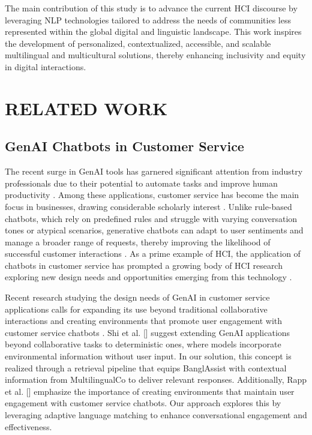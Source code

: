 \documentclass[sigconf]{acmart}
\begin{document}
The main contribution of this study is to advance the current HCI discourse by leveraging NLP technologies tailored to address the needs of communities less represented within the global digital and linguistic landscape. This work inspires the development of personalized, contextualized, accessible, and scalable multilingual and multicultural solutions, thereby enhancing inclusivity and equity in digital interactions.


\section{RELATED WORK}

\subsection{GenAI Chatbots in Customer Service}

The recent surge in GenAI tools has garnered significant attention from industry professionals due to their potential to automate tasks and improve human productivity \cite{brynjolfsson2023generative}. Among these applications, customer service has become the main focus in businesses, drawing considerable scholarly interest \cite{brynjolfsson2023generative, singla2024}. Unlike rule-based chatbots, which rely on predefined rules and struggle with varying conversation tones or atypical scenarios, generative chatbots can adapt to user sentiments and manage a broader range of requests, thereby improving the likelihood of successful customer interactions \cite{brynjolfsson2023generative}. As a prime example of HCI, the application of chatbots in customer service has prompted a growing body of HCI research exploring new design needs and opportunities emerging from this technology \cite{nicolescu2022human}.

Recent research studying the design needs of GenAI in customer service applications calls for expanding its use beyond traditional collaborative interactions \cite{shi2023hci} and creating environments that promote user engagement with customer service chatbots \cite{rapp2023collaborating}. Shi et al. [\citeyear{shi2023hci}] suggest extending GenAI applications beyond collaborative tasks to deterministic ones, where models incorporate environmental information without user input. In our solution, this concept is realized through a retrieval pipeline that equips BanglAssist with contextual information from MultilingualCo to deliver relevant responses. Additionally, Rapp et al. [\citeyear{rapp2023collaborating}] emphasize the importance of creating environments that maintain user engagement with customer service chatbots. Our approach explores this by leveraging adaptive language matching to enhance conversational engagement and effectiveness.
\end{document}
